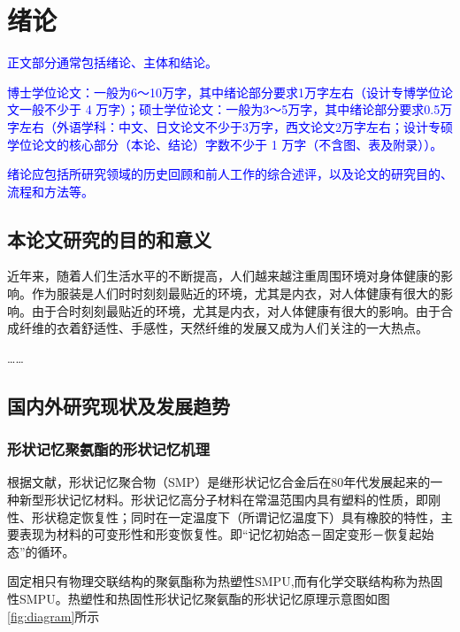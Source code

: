 
\chapter{绪论}

\textcolor{blue}{正文部分通常包括绪论、主体和结论。}

\textcolor{blue}{
  博士学位论文：一般为6～10万字，其中绪论部分要求1万字左右（设计专博学位论文一般不少于 4 万字）；硕士学位论文：一般为3～5万字，其中绪论部分要求0.5万字左右（外语学科：中文、日文论文不少于3万字，西文论文2万字左右；设计专硕学位论文的核心部分（本论、结论）字数不少于 1 万字（不含图、表及附录））。
}

\textcolor{blue}{
  绪论应包括所研究领域的历史回顾和前人工作的综合述评，以及论文的研究目的、流程和方法等。
}


\label{chap:intro}
\section{本论文研究的目的和意义}

近年来，随着人们生活水平的不断提高，人们越来越注重周围环境对身体健康的影响。作为服装是人们时时刻刻最贴近的环境，尤其是内衣，对人体健康有很大的影响。由于合时刻刻最贴近的环境，尤其是内衣，对人体健康有很大的影响。由于合成纤维的衣着舒适性、手感性，天然纤维的发展又成为人们关注的一大热点。

……\cite{Takahashi1996Structure,Xia2002Analysis,Jiang1989,Mao2000Motion,Feng1998}

\section{国内外研究现状及发展趋势}

\subsection{形状记忆聚氨酯的形状记忆机理}

根据文献\parencite{Jiang2005Size}，形状记忆聚合物（SMP）是继形状记忆合金后在80年代发展起来的一种新型形状记忆材料。形状记忆高分子材料在常温范围内具有塑料的性质，即刚性、形状稳定恢复性；同时在一定温度下（所谓记忆温度下）具有橡胶的特性，主要表现为材料的可变形性和形变恢复性。即“记忆初始态－固定变形－恢复起始态”的循环。

固定相只有物理交联结构的聚氨酯称为热塑性SMPU,而有化学交联结构称为热固性SMPU。热塑性和热固性形状记忆聚氨酯的形状记忆原理示意图如图\ref{fig:diagram}所示

